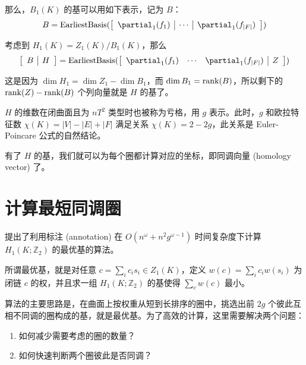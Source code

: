 那么，$ B_1(K) $ 的基可以用如下表示，记为 $ B $：
$$
B = 
{\rm EarliestBasis}(\begin{bmatrix}
    \begin{array}{c|c|c}
    \partial_1(f_1) & \cdots & \partial_1(f_{|F|})
\end{array}
\end{bmatrix})
$$

考虑到 $ H_1(K) = Z_1(K) / B_1(K) $，那么
$$
\begin{bmatrix}
    \begin{array}{c|c}
        B & H
    \end{array}
\end{bmatrix} =
{\rm EarliestBasis}(\begin{bmatrix}
    \begin{array}{ccc|c}
        \partial_1(f_1) & \cdots & \partial_1(f_{|F|}) & Z
    \end{array}
\end{bmatrix})
$$

这是因为 $ \dim H_1 = \dim Z_1 - \dim B_1 $，而 $ \dim B_1 = {\rm rank}(B) $，所以剩下的 $ {\rm rank}(Z) - {\rm rank}(B) $ 个列向量就是 $ H $ 的基了。

$ H $ 的维数在闭曲面且为 $ nT^2 $ 类型时也被称为亏格，用 $ g $ 表示。此时，$ g $ 和欧拉特征数 $ \chi(K) = |V| - |E| + |F| $ 满足关系 $ \chi(K) = 2 - 2g $，此关系是 Euler-Poincare 公式的自然结论。

有了 $ H $ 的基，我们就可以为每个圈都计算对应的坐标，即同调向量 (homology vector) 了。

\section{计算最短同调圈}
\label{sec:shortest-h1m}

\citet{Busaryev2012} 提出了利用标注 (annotation) 在 $ O(n^\omega + n^2 g^{\omega - 1}) $ 时间复杂度下计算 $ H_1(K; \mathbb{Z}_2) $ 的最优基的算法。

所谓最优基，就是对任意 $ c = \sum_i c_i s_i \in Z_1(K) $，定义 $ w(c) = \sum_i c_i w(s_i) $ 为闭链 $ c $ 的权，并且求一组 $ H_1(K; \mathbb{Z}_2) $ 的基使得 $ \sum_{c} w(c) $ 最小。

算法的主要思路是，在曲面上按权重从短到长排序的圈中，挑选出前 $ 2g $ 个彼此互相不同调的圈构成的基，就是最优基。为了高效的计算，这里需要解决两个问题：
\begin{enumerate}
    \item 如何减少需要考虑的圈的数量？
    \item 如何快速判断两个圈彼此是否同调？
\end{enumerate}

